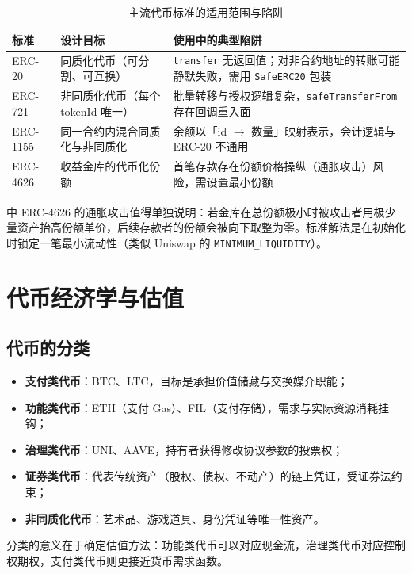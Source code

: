 \begin{table}[htbp]
\centering
\caption{主流代币标准的适用范围与陷阱}\label{tab:03-tokenstd}
\tablefont
\begin{tabular}{@{}lL{4.2cm}L{5.6cm}@{}}
\toprule
标准 & 设计目标 & 使用中的典型陷阱 \\
\midrule
ERC-20 & 同质化代币（可分割、可互换） & \texttt{transfer} 无返回值；对非合约地址的转账可能静默失败，需用 \texttt{SafeERC20} 包装 \\
ERC-721 & 非同质化代币（每个 tokenId 唯一） & 批量转移与授权逻辑复杂，\texttt{safeTransferFrom} 存在回调重入面 \\
ERC-1155 & 同一合约内混合同质化与非同质化 & 余额以「id $\to$ 数量」映射表示，会计逻辑与 ERC-20 不通用 \\
ERC-4626 & 收益金库的代币化份额 & 首笔存款存在份额价格操纵（通胀攻击）风险，需设置最小份额 \\
\bottomrule
\end{tabular}
\end{table}

中 ERC-4626 的通胀攻击值得单独说明：若金库在总份额极小时被攻击者用极少量资产抬高份额单价，后续存款者的份额会被向下取整为零。标准解法是在初始化时锁定一笔最小流动性（类似 Uniswap 的 \texttt{MINIMUM\_LIQUIDITY}）。

\section{代币经济学与估值}

\subsection{代币的分类}

\begin{itemize}[leftmargin=*]
  \item \textbf{支付类代币}：BTC、LTC，目标是承担价值储藏与交换媒介职能；
  \item \textbf{功能类代币}：ETH（支付 Gas）、FIL（支付存储），需求与实际资源消耗挂钩；
  \item \textbf{治理类代币}：UNI、AAVE，持有者获得修改协议参数的投票权；
  \item \textbf{证券类代币}：代表传统资产（股权、债权、不动产）的链上凭证，受证券法约束；
  \item \textbf{非同质化代币}：艺术品、游戏道具、身份凭证等唯一性资产。
\end{itemize}

分类的意义在于确定估值方法：功能类代币可以对应现金流，治理类代币对应控制权期权，支付类代币则更接近货币需求函数。

